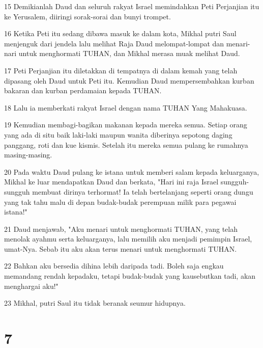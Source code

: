\par 15 Demikianlah Daud dan seluruh rakyat Israel memindahkan Peti Perjanjian itu ke Yerusalem, diiringi sorak-sorai dan bunyi trompet.
\par 16 Ketika Peti itu sedang dibawa masuk ke dalam kota, Mikhal putri Saul menjenguk dari jendela lalu melihat Raja Daud melompat-lompat dan menari-nari untuk menghormati TUHAN, dan Mikhal merasa muak melihat Daud.
\par 17 Peti Perjanjian itu diletakkan di tempatnya di dalam kemah yang telah dipasang oleh Daud untuk Peti itu. Kemudian Daud mempersembahkan kurban bakaran dan kurban perdamaian kepada TUHAN.
\par 18 Lalu ia memberkati rakyat Israel dengan nama TUHAN Yang Mahakuasa.
\par 19 Kemudian membagi-bagikan makanan kepada mereka semua. Setiap orang yang ada di situ baik laki-laki maupun wanita diberinya sepotong daging panggang, roti dan kue kismis. Setelah itu mereka semua pulang ke rumahnya masing-masing.
\par 20 Pada waktu Daud pulang ke istana untuk memberi salam kepada keluarganya, Mikhal ke luar mendapatkan Daud dan berkata, "Hari ini raja Israel sungguh-sungguh membuat dirinya terhormat! Ia telah bertelanjang seperti orang dungu yang tak tahu malu di depan budak-budak perempuan milik para pegawai istana!"
\par 21 Daud menjawab, "Aku menari untuk menghormati TUHAN, yang telah menolak ayahmu serta keluarganya, lalu memilih aku menjadi pemimpin Israel, umat-Nya. Sebab itu aku akan terus menari untuk menghormati TUHAN.
\par 22 Bahkan aku bersedia dihina lebih daripada tadi. Boleh saja engkau memandang rendah kepadaku, tetapi budak-budak yang kausebutkan tadi, akan menghargai aku!"
\par 23 Mikhal, putri Saul itu tidak beranak seumur hidupnya.

\chapter{7}

